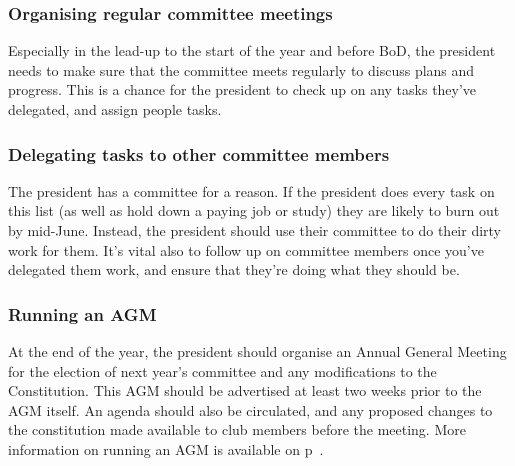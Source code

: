 \subsubsection{Organising regular committee meetings}

Especially in the lead-up to the start of the year and before BoD, the president needs to make sure that the committee meets regularly to discuss plans and progress. This is a chance for the president to check up on any tasks they've delegated, and assign people tasks.

\subsubsection{Delegating tasks to other committee members}

The president has a committee for a reason. If the president does every task on this list (as well as hold down a paying job or study) they are likely to burn out by mid-June. Instead, the president should use their committee to do their dirty work for them. It's vital also to follow up on committee members once you've delegated them work, and ensure that they're doing what they should be.

\subsubsection{Running an AGM}

At the end of the year, the president should organise an Annual General Meeting for the election of next year's committee and any modifications to the Constitution. This AGM should be advertised at least two weeks prior to the AGM itself. An agenda should also be circulated, and any proposed changes to the constitution made available to club members before the meeting. More information on running an AGM is available on p~\pageref{sec:agm}.